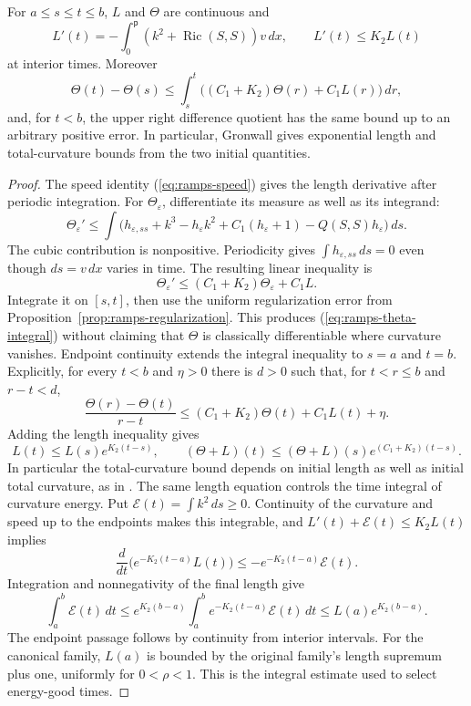 \begin{proposition}
\label{prop:ramps-length-curvature}
For $a\leq s\leq t\leq b$, $L$ and $\Theta$ are continuous and
\[
 L'(t)=-\int_0^{\mathsf p}(k^2+\operatorname{Ric}(S,S))v\,dx,
 \qquad L'(t)\leq K_2L(t)
\]
at interior times.  Moreover
\begin{equation}
 \Theta(t)-\Theta(s)\leq
 \int_s^t\bigl((C_1+K_2)\Theta(r)+C_1L(r)\bigr)\,dr,
 \label{eq:ramps-theta-integral}
\end{equation}
and, for $t<b$, the upper right difference quotient has the same bound up
to an arbitrary positive error.  In particular, Gronwall gives exponential
length and total-curvature bounds from the two initial quantities.
\end{proposition}
\begin{proof}
The speed identity (\ref{eq:ramps-speed}) gives the length derivative after
periodic integration.  For $\Theta_\varepsilon$, differentiate its measure
as well as its integrand:
\[
 \Theta_\varepsilon'
 \leq\int\bigl(h_{\varepsilon,ss}+k^3-h_\varepsilon k^2
          +C_1(h_\varepsilon+1)-Q(S,S)h_\varepsilon\bigr)\,ds.
\]
The cubic contribution is nonpositive.  Periodicity gives
$\int h_{\varepsilon,ss}\,ds=0$ even though $ds=v\,dx$ varies in time.
The resulting linear inequality is
\[
 \Theta_\varepsilon'\leq(C_1+K_2)\Theta_\varepsilon+C_1L.
\]
Integrate it on $[s,t]$, then use the uniform regularization error from
Proposition~\ref{prop:ramps-regularization}.  This produces
(\ref{eq:ramps-theta-integral}) without claiming that $\Theta$ is classically
differentiable where curvature vanishes.  Endpoint continuity extends the
integral inequality to $s=a$ and $t=b$.  Explicitly, for every $t<b$ and
$\eta>0$ there is $d>0$ such that, for $t<r\leq b$ and $r-t<d$,
\[
 \frac{\Theta(r)-\Theta(t)}{r-t}
 \leq(C_1+K_2)\Theta(t)+C_1L(t)+\eta.
\]
Adding the length inequality gives
\[
 L(t)\leq L(s)e^{K_2(t-s)},\qquad
 (\Theta+L)(t)\leq(\Theta+L)(s)e^{(C_1+K_2)(t-s)}.
\]
In particular the total-curvature bound depends on initial length as well
as initial total curvature, as in
\cite[Lemma 0.4, pp.~7--8]{MT2015Correction}.
The same length equation controls the time integral of curvature energy.
Put $\mathcal E(t)=\int k^2\,ds\ge0$.  Continuity of the curvature
and speed up to the endpoints makes this integrable, and
$L'(t)+\mathcal E(t)\le K_2L(t)$ implies
\[
 \frac d{dt}\bigl(e^{-K_2(t-a)}L(t)\bigr)
       \le-e^{-K_2(t-a)}\mathcal E(t).
\]
Integration and nonnegativity of the final length give
\[
 \int_a^b\mathcal E(t)\,dt
 \le e^{K_2(b-a)}
       \int_a^b e^{-K_2(t-a)}\mathcal E(t)\,dt
 \le L(a)e^{K_2(b-a)}.
\]
The endpoint passage follows by continuity from interior intervals.
For the canonical family, $L(a)$ is bounded by the original
family's length supremum plus one, uniformly for $0<\rho<1$.
This is the integral estimate used to select energy-good times.
\end{proof}

